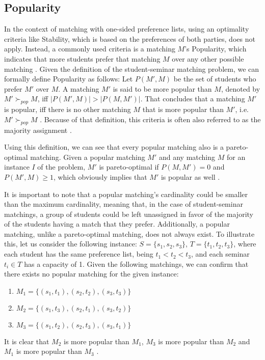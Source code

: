 \subsection{Popularity}
In the context of matching with one-sided preference lists, using an optimality criteria like Stability, which is based on the preferences of both parties, does not apply. Instead, a commonly used criteria is a matching $M$'s Popularity, which indicates that more students prefer that matching $M$ over any other possible matching \cite{ManlovePopularMatchings}. Given the definition of the student-seminar matching problem, we can formally define Popularity as follows:
Let $P(M', M)$ be the set of students who prefer $M'$ over $M$. A matching $M'$ is said to be more popular than $M$, denoted by $M' \succ_{pop} M$, iff $|P(M', M)| > |P(M, M')|$. That concludes that a matching $M'$ is popular, iff there is no other matching $M$ that is more popular than $M'$, i.e. $M' \succ_{pop} M$ \cite{Klaus, AbrahamPopular}. Because of that definition, this criteria is often also referred to as the majority assignment \cite{Gardenfors}.

Using this definition, we can see that every popular matching also is a pareto-optimal matching. Given a popular matching $M'$ and any matching $M$ for an instance $I$ of the problem, $M'$ is pareto-optimal if $P(M, M') = 0$ and $P(M', M) \geq 1$, which obviously implies that $M'$ is popular as well \cite{Klaus}.

It is important to note that a popular matching's cardinality could be smaller than the maximum cardinality, meaning that, in the case of student-seminar matchings, a group of students could be left unassigned in favor of the majority of the students having a match that they prefer.
Additionally, a popular matching, unlike a pareto-optimal matching, does not always exist. To illustrate this, let us consider the following instance: $S=\{s_1, s_2, s_3\}$, $T=\{t_1, t_2, t_3\}$, where each student has the same preference list, being $t_1 < t_2 < t_3$, and each seminar $t_i \in T$ has a capacity of 1. Given the following matchings, we can confirm that there exists no popular matching for the given instance: 
\begin{enumerate}
    \item $M_1=\{(s_1, t_1), (s_2, t_2), (s_3, t_3)\}$
    \item $M_2=\{(s_1, t_3), (s_2, t_1), (s_3, t_2)\}$
    \item $M_3=\{(s_1, t_2), (s_2, t_3), (s_3, t_1)\}$
\end{enumerate}
It is clear that $M_2$ is more popular than $M_1$, $M_3$ is more popular than $M_2$ and $M_1$ is more popular than $M_3$ \cite{AbrahamPopular}.

